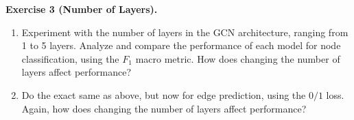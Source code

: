 \documentclass{article}
\begin{document}
\vspace{8pt}

\begin{tcolorbox}[colback = gray!16, enhanced, boxrule=0pt, frame hidden, sharp corners, borderline west={3pt}{-1.5pt}{black!80},breakable]
\textbf{Exercise 3 (Number of Layers).}
\begin{enumerate}[$(a)$]
    \item Experiment with the number of layers in the GCN architecture, ranging from 1 to 5 layers. Analyze and compare the performance of each model for node classification, using the $F_1$ macro metric. How does changing the number of layers affect performance?
    \item Do the exact same as above, but now for edge prediction, using the $0/1$ loss. Again, how does changing the number of layers affect performance?
\end{enumerate}
\end{tcolorbox}
\end{document}
